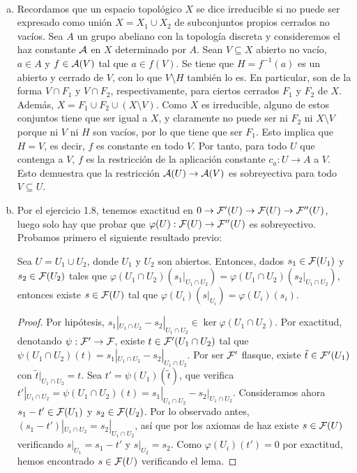 \documentclass[twoside]{article}
\begin{document}
\begin{solucion}\
\begin{enumerate}[(a)]
\item Recordamos que un espacio topológico $X$ se dice irreducible si no puede ser expresado como unión $X=X_1\cup X_2$ de subconjuntos propios cerrados no vacíos. Sea $A$ un grupo abeliano con la topología discreta y consideremos el haz constante $\mathcal{A}$ en $X$ determinado por $A$. Sean $V\subseteq X$ abierto no vacío, $a\in A$ y $f\in\mathcal{A}(V)$ tal que $a\in f(V)$. Se tiene que $H=f^{-1}(a)$ es un abierto y cerrado de $V$, con lo que $V\setminus H$ también lo es. En particular, son de la forma $V\cap F_1$ y $V\cap F_2$, respectivamente, para ciertos cerrados $F_1$ y $F_2$ de $X$. Además, $X=F_1\cup F_2\cup (X\setminus V)$. Como $X$ es irreducible, alguno de estos conjuntos tiene que ser igual a $X$, y claramente no puede ser ni $F_2$ ni $X\setminus V$ porque ni $V$ ni $H$ son vacíos, por lo que tiene que ser $F_1$. Esto implica que $H=V$, es decir, $f$ es constante en todo $V$. Por tanto, para todo $U$ que contenga a $V$, $f$ es la restricción de la aplicación constante $c_a:U\to A$ a $V$. Esto demuestra que la restricción $\mathcal{A}(U)\to\mathcal{A}(V)$ es sobreyectiva para todo $V\subseteq U$.

\item Por el ejercicio 1.8, tenemos exactitud en $0\to\mathcal{F}'(U)\to\mathcal{F}(U)\to\mathcal{F}''(U)$, luego solo hay que probar que $\varphi(U):\mathcal{F}(U)\to\mathcal{F}''(U)$ es sobreyectivo. Probamos primero el siguiente resultado previo:
\begin{lemma}
Sea $U=U_1\cup U_2$, donde $U_1$ y $U_2$ son abiertos. Entonces, dados $s_1\in\mathcal{F}(U_1)$ y $s_2\in\mathcal{F}(U_2)$ tales que $\varphi(U_1\cap U_2)(s_1|_{U_1\cap U_2})=\varphi(U_1\cap U_2)(s_2|_{U_1\cap U_2})$, entonces existe $s\in\mathcal{F}(U)$ tal que $\varphi(U_i)(s|_{U_i})=\varphi(U_i)(s_i)$. 
\end{lemma}
\begin{proof}
Por hipótesis, $s_1|_{U_1\cap U_2}-s_2|_{U_1\cap U_2}\in\ker\varphi(U_1\cap U_2)$. Por exactitud, denotando $\psi:\mathcal{F}'\to\mathcal{F}$, existe $t\in\mathcal{F}'(U_1\cap U_2)$ tal que $\psi(U_1\cap U_2)(t)=s_1|_{U_1\cap U_2}-s_2|_{U_1\cap U_2}$. Por ser $\mathcal{F}'$ flasque, existe $\tilde{t}\in\mathcal{F}'(U_1)$ con $\tilde{t}|_{U_1\cap U_2}=t$. Sea $t'=\psi(U_1)(\tilde{t})$, que verifica $t'|_{U_1\cap U_2}=\psi(U_1\cap U_2)(t)=s_1|_{U_1\cap U_2}-s_2|_{U_1\cap U_2}$. Consideramos ahora $s_1-t'\in\mathcal{F}(U_1)$ y $s_2\in\mathcal{F}(U_2)$. Por lo observado antes, $(s_1-t')|_{U_1\cap U_2}=s_2|_{U_1\cap U_2}$, así que por los axiomas de haz existe $s\in\mathcal{F}(U)$ verificando $s|_{U_1}=s_1-t'$ y $s|_{U_2}=s_2$. Como $\varphi(U_i)(t')=0$ por exactitud, hemos encontrado $s\in\mathcal{F}(U)$ verificando el lema. 
\end{proof}


\end{enumerate}
\end{solucion}
\end{document}
